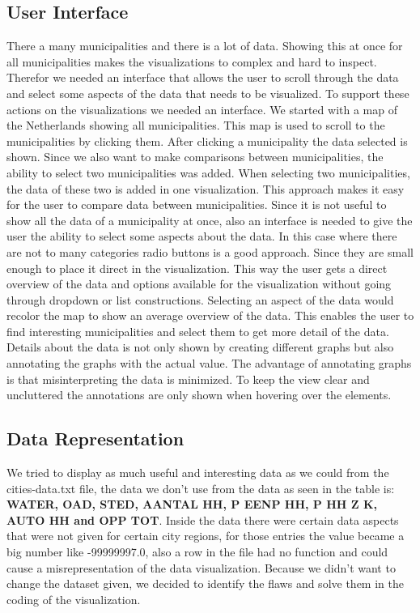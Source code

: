 \documentclass[a4paper,twoside,11pt]{article}
\begin{document}
\subsection{User Interface}
There a many municipalities and there is a lot of data. Showing this at once for all municipalities makes the visualizations to complex and hard to inspect. Therefor we needed an interface that allows the user to scroll through the data and select some aspects of the data that needs to be visualized. To support these actions on the visualizations we needed an interface. \newline
We started with a map of the Netherlands showing all municipalities. This map is used to scroll to the municipalities by clicking them. After clicking a municipality the data selected is shown.  Since we also want to make comparisons between municipalities, the ability to select two municipalities was added. When selecting two municipalities, the data of these two is added in one visualization. This approach makes it easy for the user to compare data between municipalities. \newline
Since it is not useful to show all the data of a municipality at once, also an interface is needed to give the user the ability to select some aspects about the data. In this case where there are not to many categories radio buttons is a good approach. Since they are small enough to place it direct in the visualization. This way the user gets a direct overview of the data and options available for the visualization without going through dropdown or list constructions. Selecting an aspect of the data would recolor the map to show an average overview of the data. This enables the user to find interesting municipalities and select them to get more detail of the data. \newline
Details about the data is not only shown by creating different graphs but also annotating the graphs with the actual value. The advantage of annotating graphs is that misinterpreting the data is minimized. To keep the view clear and uncluttered the annotations are only shown when hovering over the elements.

\subsection{Data Representation}
We tried to display as much useful and interesting data as we could from the cities-data.txt file, the data we don't use from the data as seen in the table is: \textbf{WATER, OAD, STED, AANTAL HH, P EENP HH, P HH Z K, AUTO HH and OPP TOT}. \newline
Inside the data there were certain data aspects that were not given for certain city regions, for those entries the value became a big number like -99999997.0, also a row in the file had no function and could cause a misrepresentation of the data visualization. Because we didn't want to change the dataset given, we decided to identify the flaws and solve them in the coding of the visualization. \newline
\newpage
\end{document}
